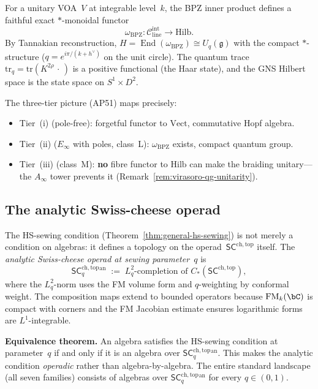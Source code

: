 \documentclass[11pt]{article}
\newcommand{\cC}{\mathcal{C}}
\newcommand{\fg}{\mathfrak{g}}
\newcommand{\SCchtop}{\mathsf{SC}^{\mathrm{ch,top}}}
\newcommand{\FM}{\mathrm{FM}}
\newcommand{\End}{\operatorname{End}}
\begin{document}
For a unitary VOA~$V$ at integrable level~$k$, the BPZ inner
product defines a faithful exact $*$-monoidal functor
\[
  \omega_{\mathrm{BPZ}}\colon
  \cC_{\mathrm{line}}^{\mathrm{int}} \longrightarrow \mathrm{Hilb}.
\]
By Tannakian reconstruction, $H = \End(\omega_{\mathrm{BPZ}})
\cong U_q(\fg)$ with the compact $*$-structure
($q = e^{i\pi/(k+h^\vee)}$ on the unit circle).
The quantum trace $\mathrm{tr}_q = \mathrm{tr}(K^{2\rho}\,
\cdot\,)$ is a positive functional (the Haar state), and the
GNS Hilbert space is the state space on
$S^1 \times D^2$.

The three-tier picture (AP51) maps precisely:
\begin{itemize}[nosep]
\item Tier~(i) (pole-free): forgetful functor to
  $\mathrm{Vect}$, commutative Hopf algebra.
\item Tier~(ii) ($E_\infty$ with poles, class~L): $\omega_{\mathrm{BPZ}}$
  exists, compact quantum group.
\item Tier~(iii) (class~M): \textbf{no} fibre functor to
  $\mathrm{Hilb}$ can make the braiding unitary---the
  $A_\infty$ tower prevents it
  (Remark~\ref{rem:virasoro-qg-unitarity}).
\end{itemize}

\subsection{The analytic Swiss-cheese operad}
\label{sec:analytic-sc-operad}

The HS-sewing condition
(Theorem~\ref*{thm:general-hs-sewing})
is not merely a condition on algebras: it defines a topology
on the operad~$\SCchtop$ itself.  The \emph{analytic
Swiss-cheese operad at sewing parameter~$q$} is
\[
  \SCchtop_q^{\mathrm{an}}
  \;:=\;
  L^2_q\text{-completion of }
  C_*(\SCchtop),
\]
where the $L^2_q$-norm uses the FM volume form and
$q$-weighting by conformal weight.  The composition maps
extend to bounded operators because $\FM_k(\bC)$ is compact
with corners and the FM Jacobian estimate ensures logarithmic
forms are $L^1$-integrable.

\textbf{Equivalence theorem.}
An algebra satisfies the HS-sewing condition at
parameter~$q$ if and only if it is an algebra over
$\SCchtop_q^{\mathrm{an}}$.  This makes the analytic
condition \emph{operadic} rather than algebra-by-algebra.
The entire standard landscape (all seven families) consists
of algebras over $\SCchtop_q^{\mathrm{an}}$ for every
$q \in (0,1)$.
\end{document}

